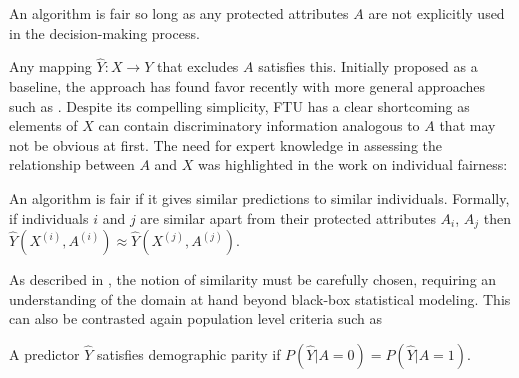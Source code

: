 \begin{define}
  An algorithm is fair so long as any protected attributes $A$ are not
  explicitly used in the decision-making process. 
\end{define}
Any mapping $\hat{Y}: X \rightarrow Y$ that excludes $A$ satisfies
this. Initially proposed as a baseline, the approach has found
favor recently with more general approaches such as \citet{grgiccase}.
Despite its compelling simplicity, FTU has a clear
shortcoming as elements of $X$ can contain discriminatory information
analogous to $A$ that may not be obvious at first. The need for expert
knowledge in assessing the relationship between $A$ and $X$ was
highlighted in the work on individual fairness:
%
\begin{define}
  An algorithm is fair if it gives similar predictions to similar
  individuals. Formally, if individuals $i$ and $j$ are similar apart
  from their protected attributes $A_i$, $A_j$ then
  $\hat{Y}(X^{(i)}, A^{(i)}) \approx \hat{Y}(X^{(j)}, A^{(j)})$.
\end{define}
As described in \cite{dwork2012fairness}, the notion of similarity
must be carefully chosen, requiring an understanding of the domain at
hand beyond black-box statistical modeling. This can also be
contrasted again population level criteria such as
%
\begin{define} 
A predictor  $\hat{Y}$ satisfies demographic parity if
$P(\hat{Y} | A = 0) = P(\hat{Y} | A = 1)$. %
\end{define}
